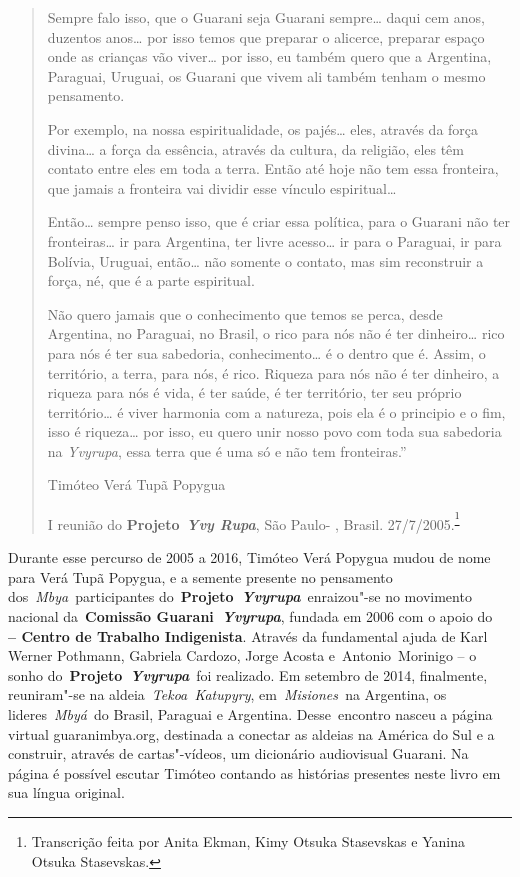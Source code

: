\begin{quote}
Sempre falo isso, que o Guarani seja Guarani sempre… daqui cem
anos, duzentos anos… por isso temos que preparar o alicerce,
preparar espaço onde as crianças vão viver… por isso, eu também
quero que a Argentina, Paraguai, Uruguai, os Guarani que vivem ali
também tenham o mesmo pensamento.

Por exemplo, na nossa espiritualidade, os pajés… eles, através da
força divina… a força da essência, através da cultura, da
religião, eles têm contato entre eles em toda a terra. Então até hoje
não tem essa fronteira, que jamais a fronteira vai dividir esse vínculo
espiritual…

Então… sempre penso isso, que é criar essa política, para o
Guarani não ter fronteiras… ir para Argentina, ter livre
acesso… ir para o Paraguai, ir para Bolívia, Uruguai,
então… não somente o contato, mas sim reconstruir a força, né,
que é a parte espiritual.

Não quero jamais que o conhecimento que temos se perca, desde Argentina,
no Paraguai, no Brasil, o rico para nós não é ter dinheiro… rico
para nós é ter sua sabedoria, conhecimento… é o dentro que é.
Assim, o território, a terra, para nós, é rico. Riqueza para nós não é
ter dinheiro, a riqueza para nós é vida, é ter saúde, é ter território,
ter seu próprio território… é viver harmonia com a natureza, pois
ela é o principio e o fim, isso é riqueza… por isso, eu quero
unir nosso povo com toda sua sabedoria na \emph{Yvyrupa}, essa terra que
é uma só e não tem fronteiras.''

Timóteo Verá Tupã Popygua

I reunião do \textbf{Projeto}~\emph{\textbf{Yvy Rupa}}, São Paulo- ,
Brasil. 27/7/2005.\textsuperscript{\footnote{Transcrição feita por Anita Ekman, Kimy Otsuka Stasevskas e Yanina
Otsuka Stasevskas.} }
\end{quote}

 

Durante esse percurso de 2005 a 2016, Timóteo Verá Popygua mudou de nome
para Verá Tupã Popygua, e a semente presente no pensamento
dos~\emph{Mbya}~participantes
do~\textbf{Projeto~}\emph{\textbf{Yvyrupa}}~enraizou"-se no movimento
nacional da~\textbf{Comissão Guarani~}\emph{\textbf{Yvyrupa}}, fundada
em 2006 com o apoio do~\textbf{ -- Centro de Trabalho Indigenista}.
Através da fundamental ajuda de Karl Werner Pothmann, Gabriela Cardozo,
Jorge Acosta e~Antonio~Morinigo -- o sonho
do~\textbf{Projeto~}\emph{\textbf{Yvyrupa}}~foi realizado. Em setembro
de 2014, finalmente, reuniram"-se na aldeia~\emph{Tekoa~Katupyry},
em~\emph{Misiones~}na Argentina, os lideres~\emph{Mbyá}~do Brasil,
Paraguai e Argentina. Desse~encontro nasceu a página
virtual guaranimbya.org, destinada a conectar as aldeias
na América do Sul e a construir, através de cartas"-vídeos, um dicionário
audiovisual Guarani. Na página é possível escutar Timóteo contando as
histórias presentes neste livro em sua língua original.~

